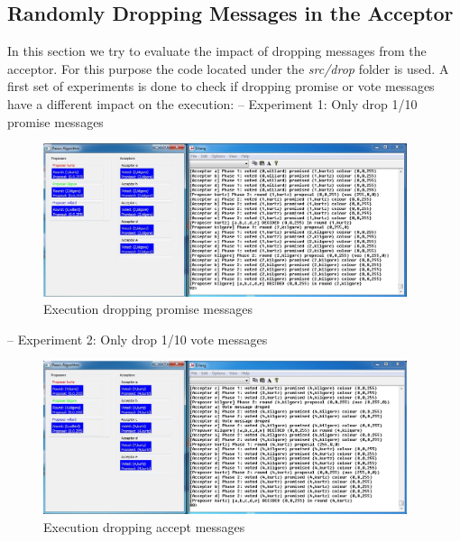 \subsection{Randomly Dropping Messages in the Acceptor}
In this section we try to evaluate the impact of dropping messages from the 
acceptor. For this purpose the code located under the \textit{src/drop} folder is
used. A first set of experiments is done to check if dropping promise or vote
messages have a different impact on the execution: \newline
– Experiment 1: Only drop 1/10 promise messages\newline
\begin{figure}[h!]
  \centering
    \includegraphics[width=0.95\textwidth]{./3_Experiments/images/drop_promise.jpg}
    \caption{Execution dropping promise messages \label{fig:drop_promise}}
\end{figure}
\newpage
– Experiment 2: Only drop 1/10 vote messages\newline
\begin{figure}[h!]
  \centering
    \includegraphics[width=0.95\textwidth]{./3_Experiments/images/drop_accept.jpg}
    \caption{Execution dropping accept messages\label{fig:drop_accept}}
\end{figure}


